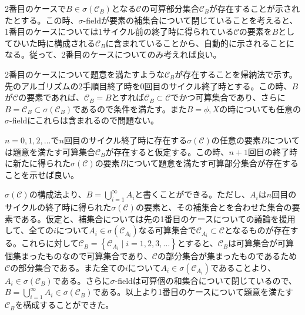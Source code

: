 \documentclass{article}
\begin{document}
2番目のケースで$B \in \sigma(\mathcal{C}_B)$となる$\mathcal{C}$の可算部分集合$\mathcal{C}_B$が存在することが示されたとする。この時、$\sigma$-fieldが要素の補集合について閉じていることを考えると、1番目のケースについては1サイクル前の終了時に得られている$\mathcal{C}$の要素を$B$としてひいた時に構成される$\mathcal{C}_B$に含まれていることから、自動的に示されることになる。従って、2番目のケースについてのみ考えれば良い。

2番目のケースについて題意を満たすような$\mathcal{C}_B$が存在することを帰納法で示す。先のアルゴリズムの2手順目終了時を0回目のサイクル終了時とする。この時、$B$が$\mathcal{C}$の要素であれば、$\mathcal{C}_B = B$とすれば$\mathcal{C}_B \subset \mathcal{C}$でかつ可算集合であり、さらに$B = \mathcal{C}_B \subset \sigma(\mathcal{C}_B)$であるので条件を満たす。また$B = \phi,X$の時についても任意の$\sigma$-fieldにこれらは含まれるので問題ない。

$n = 0,1,2,\dots$で$n$回目のサイクル終了時に存在する$\sigma(\mathcal{C})$の任意の要素$B$については題意を満たす可算集合$\mathcal{C}_B$が存在すると仮定する。この時、$n+1$回目の終了時に新たに得られた$\sigma(\mathcal{C})$の要素$B$について題意を満たす可算部分集合が存在することを示せば良い。

$\sigma(\mathcal{C})$の構成法より、$B = \bigcup_{i = 1}^{\infty} A_i$と書くことができる。ただし、$A_i$は$n$回目のサイクルの終了時に得られた$\sigma(\mathcal{C})$の要素と、その補集合とを合わせた集合の要素である。仮定と、補集合については先の1番目のケースについての議論を援用して、全ての$i$について$A_i \in \sigma(\mathcal{C}_{A_i})$なる可算集合で$\mathcal{C}_{A_i} \subset \mathcal{C}$となるものが存在する。これらに対して$\mathcal{C}_B = \left\{ \mathcal{C}_{A_i} \mid i = 1,2,3,\dots \right\}$とすると、$\mathcal{C}_B$は可算集合が可算個集まったものなので可算集合であり、$\mathcal{C}$の部分集合が集まったものであるため$\mathcal{C}$の部分集合である。また全ての$i$について$A_i \in \sigma(\mathcal{C}_{A_i})$であることより、$A_i \in \sigma(\mathcal{C}_B)$である。さらに$\sigma$-fieldは可算個の和集合について閉じているので、$B = \bigcup_{i = 1}^{\infty} A_i \in \sigma(\mathcal{C}_B)$である。以上より1番目のケースについて題意を満たす$\mathcal{C}_B$を構成することができた。
\end{document}
